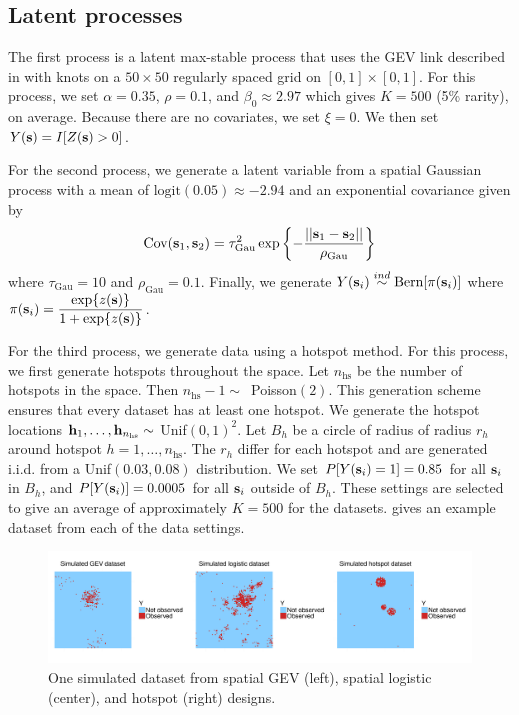 \documentclass[11pt]{article}
\begin{document}
\subsection{Latent processes} \label{rbs:simsettings}

The first process is a latent max-stable process that uses the GEV link described in  with knots on a $50 \times 50$ regularly spaced grid on $[0, 1] \times [0, 1]$.
For this process, we set $\alpha = 0.35$, $\rho = 0.1$, and $\beta_0 \approx 2.97$ which gives $K = 500$ (5\% rarity), on average.
Because there are no covariates, we set $\xi = 0$.
We then set $Y(\mbox{\bf s}) = I[Z(\mbox{\bf s}) > 0]$.

For the second process, we generate a latent variable from a spatial Gaussian process with a mean of $\text{logit}(0.05) \approx -2.94$ and an exponential covariance given by
\begin{align}
  \text{Cov}(\mbox{\bf s}_1, \mbox{\bf s}_2) = \tau_\text{Gau}^2 \exp\left\{- \frac{||\mbox{\bf s}_1 - \mbox{\bf s}_2||}{\rho_\text{Gau}}\right\}
\end{align}
where $\tau_\text{Gau} = 10$ and $\rho_\text{Gau} = 0.1$.
Finally, we generate $Y(\mbox{\bf s}_i) \stackrel{ind}{\sim} \text{Bern}[\pi(\mbox{\bf s}_i)]$
where $\pi(\mbox{\bf s}_i) = \displaystyle \frac{ \exp\{z(\mbox{\bf s})\}}{1 + \exp\{z(\mbox{\bf s})\} }$.

For the third process, we generate data using a hotspot method.
For this process, we first generate hotspots throughout the space.
Let $n_\text{hs}$ be the number of hotspots in the space.
Then \mbox{$n_\text{hs} - 1 \sim$ Poisson$(2)$}.
This generation scheme ensures that every dataset has at least one hotspot.
We generate the hotspot locations $\mbox{\bf h}_1, \ldots, \mbox{\bf h}_{n_\text{hs}} \sim$ Unif$(0, 1)^2$.
Let $B_h$ be a circle of radius of radius $r_h$ around hotspot $h = 1, \ldots, n_\text{hs}$.
The $r_h$ differ for each hotspot and are generated i.i.d. from a Unif$(0.03, 0.08)$ distribution.
We set $P[Y(\mbox{\bf s}_i) = 1] = 0.85$ for all $\mbox{\bf s}_i$ in $B_h$, and $P[Y(\mbox{\bf s}_i)] = 0.0005$ for all $\mbox{\bf s}_i$ outside of $B_h$.
These settings are selected to give an average of approximately $K = 500$ for the datasets.
 gives an example dataset from each of the data settings.

\begin{figure}  %
  \centering
  \includegraphics[width=\linewidth, trim={0em, 1em, 0em, 1em}]{plots/simulateddata}
  \caption{One simulated dataset from spatial GEV (left), spatial logistic (center), and hotspot (right) designs.}
  \label{rbfig:simulateddata}
\end{figure}
\end{document}
